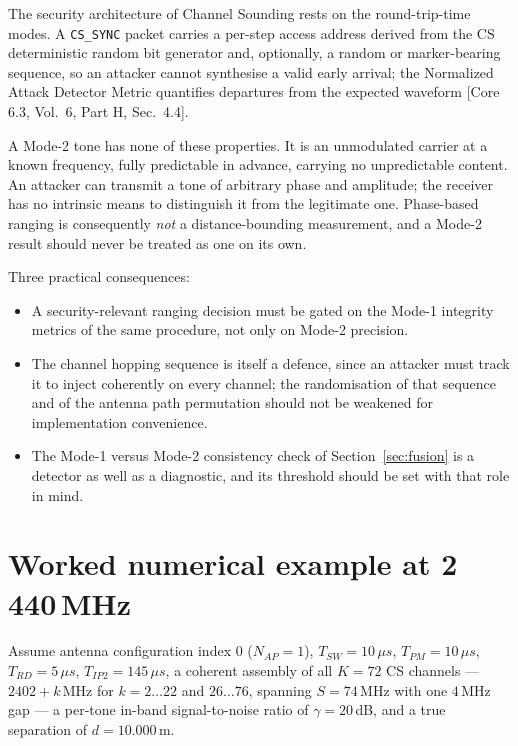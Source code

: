 \documentclass[11pt,a4paper]{article}
\newcommand{\us}{\,\ensuremath{\upmu}s}
\newcommand{\Tsw}{T_{SW}}
\newcommand{\Tpm}{T_{PM}}
\newcommand{\Trd}{T_{RD}}
\newcommand{\Tipp}{T_{IP2}}
\newcommand{\Nap}{N_{AP}}
\newcommand{\code}[1]{\texttt{\small #1}}
\providecommand{\upmu}{\mu}
\newcommand{\core}[1]{\textcolor{rulegrey}{\small[Core 6.3, #1]}}
\begin{document}
The security architecture of Channel Sounding rests on the round-trip-time modes. A \code{CS\_SYNC}
packet carries a per-step access address derived from the CS deterministic random bit generator and,
optionally, a random or marker-bearing sequence, so an attacker cannot synthesise a valid early
arrival; the Normalized Attack Detector Metric quantifies departures from the expected waveform
\core{Vol.\ 6, Part H, Sec.\ 4.4}.

A Mode-2 tone has none of these properties. It is an unmodulated carrier at a known frequency, fully
predictable in advance, carrying no unpredictable content. An attacker can transmit a tone of
arbitrary phase and amplitude; the receiver has no intrinsic means to distinguish it from the
legitimate one. Phase-based ranging is consequently \emph{not} a distance-bounding measurement, and a
Mode-2 result should never be treated as one on its own.

Three practical consequences:

\begin{itemize}[leftmargin=1.4em,itemsep=1pt]
  \item A security-relevant ranging decision must be gated on the Mode-1 integrity metrics of the
    same procedure, not only on Mode-2 precision.
  \item The channel hopping sequence is itself a defence, since an attacker must track it to inject
    coherently on every channel; the randomisation of that sequence and of the antenna path
    permutation should not be weakened for implementation convenience.
  \item The Mode-1 versus Mode-2 consistency check of Section~\ref{sec:fusion} is a detector as well
    as a diagnostic, and its threshold should be set with that role in mind.
\end{itemize}

\section{Worked numerical example at 2\,440\,MHz}
\label{sec:example}

Assume antenna configuration index 0 ($\Nap = 1$), $\Tsw = 10\us$, $\Tpm = 10\us$, $\Trd = 5\us$,
$\Tipp = 145\us$, a coherent assembly of all $K = 72$ CS channels --- $2402+k$\,MHz for
$k = 2\ldots22$ and $26\ldots76$, spanning $S = 74$\,MHz with one $4$\,MHz gap --- a per-tone in-band signal-to-noise ratio of $\gamma = 20$\,dB, and a true
separation of $d = 10.000$\,m.
\end{document}
